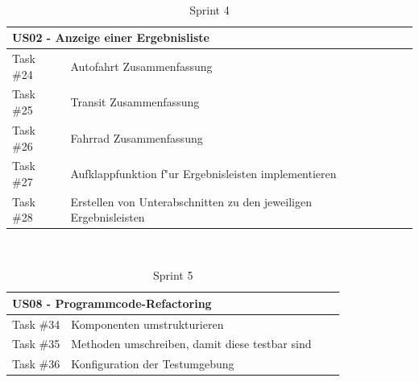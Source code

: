 \documentclass[a4paper, 11pt]{scrreprt}
\begin{document}
\begin{table}[H]

\caption{Sprint 4}

\ \\

\par

\label{tab:Sprint 4}

\centering

\begin{tabular}{|p{2.5cm} p{12cm}| ll}

\hline
\multicolumn{2}{|l|}{US02 - Anzeige einer Ergebnisliste} \\

\hline
Task \#24 & Autofahrt Zusammenfassung\\

\hline
Task \#25 & Transit Zusammenfassung\\

\hline
Task \#26 & Fahrrad Zusammenfassung\\

\hline
Task \#27 & Aufklappfunktion f"ur Ergebnisleisten implementieren\\

\hline
Task \#28 & Erstellen von Unterabschnitten zu den jeweiligen Ergebnisleisten\\

\hline
\end{tabular}

\end{table}

\begin{table}[H]

\caption{Sprint 5}

\ \\

\par

\label{tab:Sprint 5}

\centering

\begin{tabular}{|p{2.5cm} p{12cm}| ll}

\hline
\multicolumn{2}{|l|}{US08 - Programmcode-Refactoring} \\

\hline
Task \#34 & Komponenten umstrukturieren\\

\hline
Task \#35 & Methoden umschreiben, damit diese testbar sind\\

\hline
Task \#36 & Konfiguration der Testumgebung\\

\hline
\end{tabular}

\end{table}
\end{document}
